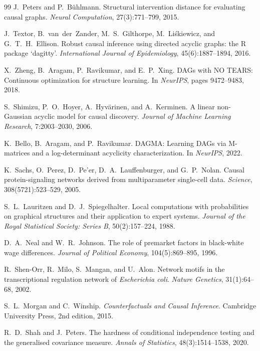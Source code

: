 \documentclass[11pt,a4paper]{article}
\theoremstyle{definition}
\theoremstyle{remark}
\begin{document}
\begin{thebibliography}{99}
J.~Peters and P.~B\"uhlmann.
\newblock Structural intervention distance for evaluating causal graphs.
\newblock \emph{Neural Computation}, 27(3):771--799, 2015.

J.~Textor, B.~van~der~Zander, M.~S.~Gilthorpe, M.~Li\'{s}kiewicz, and
  G.~T.~H.~Ellison.
\newblock Robust causal inference using directed acyclic graphs: the R package
  `dagitty'.
\newblock \emph{International Journal of Epidemiology}, 45(6):1887--1894, 2016.

X.~Zheng, B.~Aragam, P.~Ravikumar, and E.~P.~Xing.
\newblock DAGs with NO TEARS: Continuous optimization for structure learning.
\newblock In \emph{NeurIPS}, pages 9472--9483, 2018.

S.~Shimizu, P.~O.~Hoyer, A.~Hyv\"arinen, and A.~Kerminen.
\newblock A linear non-{G}aussian acyclic model for causal discovery.
\newblock \emph{Journal of Machine Learning Research}, 7:2003--2030, 2006.

K.~Bello, B.~Aragam, and P.~Ravikumar.
\newblock DAGMA: Learning DAGs via M-matrices and a log-determinant acyclicity
  characterization.
\newblock In \emph{NeurIPS}, 2022.

K.~Sachs, O.~Perez, D.~Pe'er, D.~A.~Lauffenburger, and G.~P.~Nolan.
\newblock Causal protein-signaling networks derived from multiparameter
  single-cell data.
\newblock \emph{Science}, 308(5721):523--529, 2005.

S.~L.~Lauritzen and D.~J.~Spiegelhalter.
\newblock Local computations with probabilities on graphical structures and
  their application to expert systems.
\newblock \emph{Journal of the Royal Statistical Society: Series B},
  50(2):157--224, 1988.

D.~A.~Neal and W.~R.~Johnson.
\newblock The role of premarket factors in black-white wage differences.
\newblock \emph{Journal of Political Economy}, 104(5):869--895, 1996.

R.~Shen-Orr, R.~Milo, S.~Mangan, and U.~Alon.
\newblock Network motifs in the transcriptional regulation network of
  \emph{Escherichia coli}.
\newblock \emph{Nature Genetics}, 31(1):64--68, 2002.

S.~L.~Morgan and C.~Winship.
\newblock \emph{Counterfactuals and Causal Inference}.
\newblock Cambridge University Press, 2nd edition, 2015.

R.~D.~Shah and J.~Peters.
\newblock The hardness of conditional independence testing and the generalised
  covariance measure.
\newblock \emph{Annals of Statistics}, 48(3):1514--1538, 2020.


\end{thebibliography}
\end{document}
